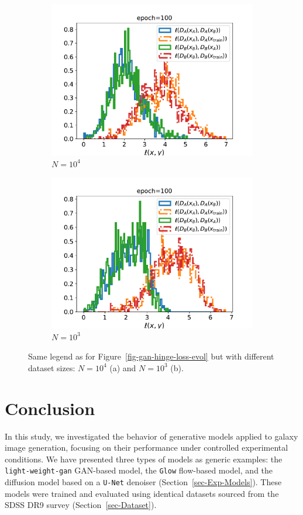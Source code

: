 \documentclass[fleqn,usenatbib]{mnras}
\begin{document}
\begin{figure}
    \centering
        \begin{subfigure}[b]{\columnwidth}
        \centering
        \includegraphics[width=0.8\linewidth]{fig-gan-loss_discri_10000_A_B_num_100.pdf}
        \caption{$N=10^4$}
        \end{subfigure}%
    \hfill
        \begin{subfigure}[b]{\columnwidth}
        \centering
        \includegraphics[width=0.8\linewidth]{fig-gan-loss_discri_1000_A_B_num_100.pdf}
        \caption{$N=10^3$}
        \end{subfigure}%
	\caption{Same legend as for Figure~\ref{fig-gan-hinge-loss-evol} but with different dataset sizes: $N=10^4$ (a) and $N=10^3$ (b).}
	\label{fig-gan-hinge-loss-epoch100-ntrain-10p3-10p4}
\end{figure}
%
\section{Conclusion}
\label{sec-conclusion}
%
In this study, we investigated the behavior of generative models applied to galaxy image generation, focusing on their performance under controlled experimental conditions. We {\color{red} have presented three types of models as generic examples}: the \texttt{light-weight-gan} GAN-based model, the \texttt{Glow} flow-based model, and the diffusion model based on a \texttt{U-Net} denoiser (Section~\ref{sec-Exp-Models}). These models were trained and evaluated using identical datasets sourced from the SDSS {\color{red}DR9} survey (Section~\ref{sec-Dataset}).
\end{document}
